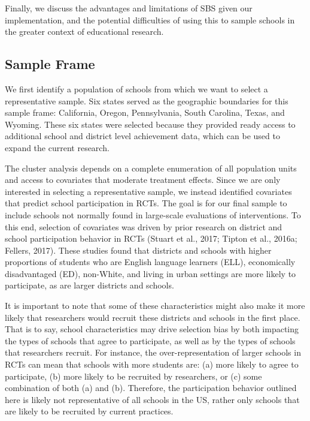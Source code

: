 \documentclass[
  english,
  man,floatsintext]{apa6}
\begin{document}
Finally, we discuss the advantages and limitations of SBS given our implementation, and the potential difficulties of using this to sample schools in the greater context of educational research.

\hypertarget{sample-frame}{%
\subsection{Sample Frame}\label{sample-frame}}

We first identify a population of schools from which we want to select a representative sample. Six states served as the geographic boundaries for this sample frame: California, Oregon, Pennsylvania, South Carolina, Texas, and Wyoming. These six states were selected because they provided ready access to additional school and district level achievement data, which can be used to expand the current research.

The cluster analysis depends on a complete enumeration of all population units and access to covariates that moderate treatment effects. Since we are only interested in selecting a representative sample, we instead identified covariates that predict school participation in RCTs. The goal is for our final sample to include schools not normally found in large-scale evaluations of interventions. To this end, selection of covariates was driven by prior research on district and school participation behavior in RCTs (Stuart et al., 2017; Tipton et al., 2016a; Fellers, 2017). These studies found that districts and schools with higher proportions of students who are English language learners (ELL), economically disadvantaged (ED), non-White, and living in urban settings are more likely to participate, as are larger districts and schools.

It is important to note that some of these characteristics might also make it more likely that researchers would recruit these districts and schools in the first place. That is to say, school characteristics may drive selection bias by both impacting the types of schools that agree to participate, as well as by the types of schools that researchers recruit. For instance, the over-representation of larger schools in RCTs can mean that schools with more students are: (a) more likely to agree to participate, (b) more likely to be recruited by researchers, or (c) some combination of both (a) and (b). Therefore, the participation behavior outlined here is likely not representative of all schools in the US, rather only schools that are likely to be recruited by current practices.
\end{document}
